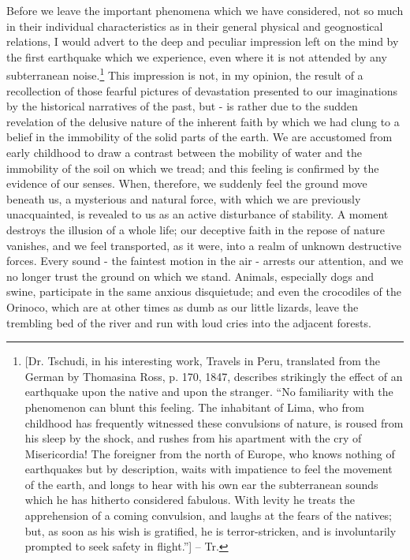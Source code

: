 Before we leave the important phenomena which we have considered, not so much in their individual characteristics as in their general physical and geognostical relations, I would advert to the deep and peculiar impression left on the mind by the first earthquake which we experience, even where it is not attended by any subterranean noise.\footnote{[Dr. Tschudi, in his interesting work, Travels in Peru, translated from the German by Thomasina Ross, p. 170, 1847, describes strikingly the effect of an earthquake upon the native and upon the stranger. “No familiarity with the phenomenon can blunt this feeling. The inhabitant of Lima, who from childhood has frequently witnessed these convulsions of nature, is roused from his sleep by the shock, and rushes from his apartment with the cry of Misericordia! The foreigner from the north of Europe, who knows nothing of earthquakes but by description, waits with impatience to feel the movement of the earth, and longs to hear with his own ear the subterranean sounds which he has hitherto considered fabulous. With levity he treats the apprehension of a coming convulsion, and laughs at the fears of the natives; but, as soon as his wish is gratified, he is terror-stricken, and is involuntarily prompted to seek safety in flight.”] -- Tr.} This impression is not, in my opinion, the result of a recollection of those fearful pictures of devastation presented to our imaginations by the historical narratives of the past, but - is rather due to the sudden revelation of the delusive nature of the inherent faith by which we had clung to a belief in the immobility of the solid parts of the earth. We are accustomed from early childhood to draw a contrast between the mobility of water and the immobility of the soil on which we tread; and this feeling is confirmed by the evidence of our senses. When, therefore, we suddenly feel the ground move beneath us, a mysterious and natural force, with which we are previously unacquainted, is revealed to us as an active disturbance of stability. A moment destroys the illusion of a whole life; our deceptive faith in the repose of nature vanishes, and we feel transported, as it were, into a realm of unknown destructive forces. Every sound - the faintest motion in the air - arrests our attention, and we no longer trust the ground on which we stand. Animals, especially dogs and swine, participate in the same anxious disquietude; and even the crocodiles of the Orinoco, which are at other times as dumb as our little lizards, leave the trembling bed of the river and run with loud cries into the adjacent forests.

